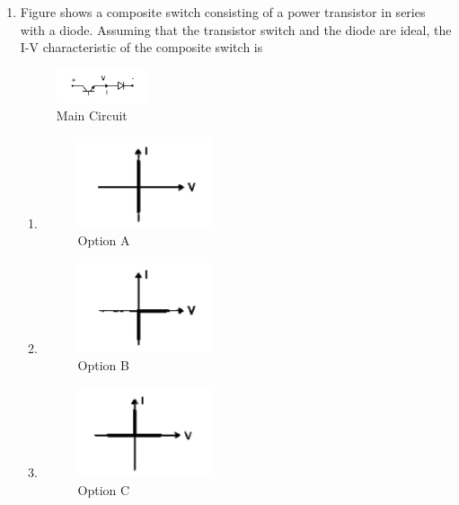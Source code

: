 \documentclass[12pt]{article}
\theoremstyle{remark}
\begin{document}
\begin{enumerate}
\item Figure shows a composite switch consisting of a power transistor  in series with a diode. Assuming that the transistor switch and the diode are ideal, the I-V characteristic of the composite switch is
\begin{figure}[H]
    \centering
    \includegraphics[width=0.25\textwidth]{Figs/Q24.png}
    \caption{Main Circuit}
    \label{fig:1.15}
\end{figure}
\begin{enumerate}
    \item \begin{figure}[H]\centering\includegraphics[width=0.4\textwidth]{Figs/Q24A.png}\caption{Option A}\label{fig:1.16}\end{figure}
    \item \begin{figure}[H]\centering\includegraphics[width=0.4\textwidth]{Figs/Q24B.png}\caption{Option B}\label{fig:1.17}\end{figure}
    \item \begin{figure}[H]\centering\includegraphics[width=0.4\textwidth]{Figs/Q24C.png}\caption{Option C}\label{fig:1.18}\end{figure}

\end{enumerate}
\end{enumerate}
\end{document}
